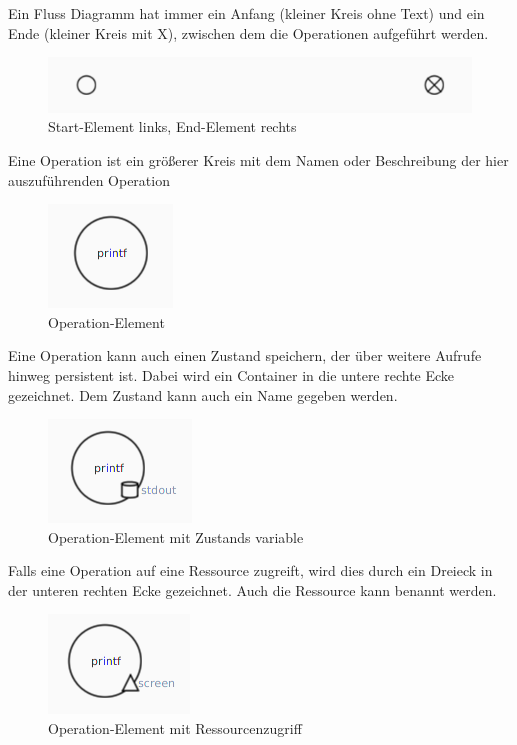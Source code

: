 \subsubsection{\textFlowElements}
\label{\textFlowElements}

Ein Fluss Diagramm hat immer ein Anfang (kleiner Kreis ohne Text) und ein Ende (kleiner Kreis mit X), zwischen dem
die Operationen aufgeführt werden.
\begin{figure}[H]
	\centering
	\includegraphics[width=\maxwidth{.9\textwidth}]{Element_Start_End.png}
	\caption{Start-Element links, End-Element rechts}
\end{figure}


Eine Operation ist ein größerer Kreis mit dem Namen oder Beschreibung der hier auszuführenden Operation
\begin{figure}[H]
	\centering
	\includegraphics[width=\maxwidth{.9\textwidth}]{Element_Operation.png}
	\caption{Operation-Element}
\end{figure}

Eine Operation kann auch einen Zustand speichern, der über weitere Aufrufe hinweg persistent ist. Dabei wird 
ein Container in die untere rechte Ecke gezeichnet. Dem Zustand kann auch ein Name gegeben werden.
\begin{figure}[H]
	\centering
	\includegraphics[width=\maxwidth{.9\textwidth}]{Element_Operation_Zustand.png}
	\caption{Operation-Element mit Zustands variable}
\end{figure}

Falls eine Operation auf eine Ressource zugreift, wird dies durch ein Dreieck in der unteren rechten Ecke gezeichnet.
Auch die Ressource kann benannt werden.
\begin{figure}[H]
	\centering
	\includegraphics[width=\maxwidth{.9\textwidth}]{Element_Operation_Resource.png}
	\caption{Operation-Element mit Ressourcenzugriff}
\end{figure}

